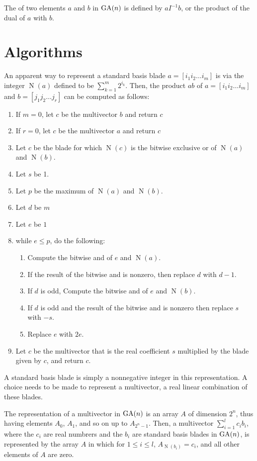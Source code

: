 \documentclass{amsproc}
\theoremstyle{definition}
\theoremstyle{remark}
\numberwithin{equation}{section}
\begin{document}
The  of two elements $a$ and $b$ in $\mathop{\mathrm{GA}}(n)$ is defined by
$aI^{-1}b$, or the product of the dual of $a$ with $b$.

\section{Algorithms}
\newcommand{\n}{\ensuremath{\mathop{\mathrm{N}}}} An apparent way to
represent a standard basis blade $a=[i_1i_2\dots{i}_m]$ is via the
integer $\n(a)$ defined to be $\sum_{k=1}^{m}2^{i_k}$.  Then, the
product $ab$ of $a=[i_1i_2\dots{i}_m]$ and $b=[j_1j_2\dots{j}_r]$
can be computed as follows:

\begin{enumerate}
\item If $m=0$, let $c$ be the multivector $b$ and return $c$
\item If $r=0$, let $c$ be the multivector $a$ and return $c$
\item Let $c$ be the blade for which $\n(c)$ is the bitwise exclusive
  or of $\n(a)$ and $\n(b)$.
\item Let $s$ be 1.
\item Let $p$ be the maximum of $\n(a)$ and $\n(b)$.
\item Let $d$ be $m$
\item Let $e$ be $1$
\item while $e\le{p}$, do the following:
  \begin{enumerate}
  \item Compute the bitwise and of $e$ and $\n(a)$.
  \item If the result of the bitwise and is nonzero, then replace $d$ with $d-1$.
  \item If $d$ is odd, Compute the bitwise and of $e$ and $\n(b)$.
  \item If $d$ is odd and the result of the bitwise and is nonzero
    then replace $s$ with $-s$.
  \item Replace $e$ with $2e$.
  \end{enumerate}
\item Let $c$ be the multivector that is the real coefficient $s$
  multiplied by the blade given by $c$, and return $c$.
\end{enumerate}

A standard basis blade is simply a nonnegative integer in this
representation.  A choice needs to be made to represent a multivector,
a real linear combination of these blades.

The  representation of a multivector in $\mathop{\mathrm{GA}}(n)$ is an
array $A$ of dimension $2^n$, thus having elements $A_0$, $A_1$, and
so on up to $A_{2^n-1}$.  Then, a multivector $\sum_{i=1}^{l}c_ib_i$,
where the $c_i$ are real numbrers and the $b_i$ are standard basis
blades in $\mathop{\mathrm{GA}}(n)$, is represented by the array $A$ in which for
$1\le{i}\le{l}$, $A_{\n(b_i)} = c_i$, and all other elements of $A$
are zero.
\end{document}
